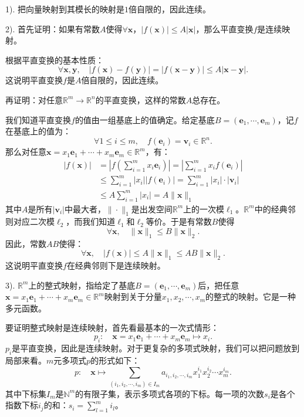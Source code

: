 \documentclass[12pt,UTF8,fontset=none]{ctexbook}
\begin{document}
\begin{so}
    1). 把向量映射到其模长的映射是$1$倍自限的，因此连续。

    2). 首先证明：如果有常数$A$使得$\forall \mathbf{x}$，$|f(\mathbf{x})|\leqslant A|\mathbf{x}|$，那么平直变换$f$是连续映射。

    根据平直变换的基本性质：
    $$ \forall \mathbf{x}, \mathbf{y}, \quad |f(\mathbf{x}) - f(\mathbf{y})| = |f(\mathbf{x} - \mathbf{y})| \leqslant A|\mathbf{x} - \mathbf{y}|.$$
    这说明平直变换$f$是$A$倍自限的，因此连续。

    再证明：对任意$\mathbb{R}^m \rightarrow \mathbb{R}^n$的平直变换，这样的常数$A$总存在。

    我们知道平直变换$f$的值由一组基底上的值确定。给定基底$B = (\mathbf{e}_1, \cdots, \mathbf{e}_m)$，记$f$在基底上的值为：
    $$ \forall 1\leqslant i\leqslant m, \quad f(\mathbf{e}_i) = \mathbf{v}_i\in\mathbb{R}^n.$$
    那么对任意$\mathbf{x} = x_1\mathbf{e}_1 + \cdots + x_m\mathbf{e}_m\in\mathbb{R}^m$，有：
    \begin{align*}
        |f(\mathbf{x})| &= \left|f\left(\sum_{i=1}^m x_i \mathbf{e}_i\right)\right| = \left|\sum_{i=1}^m x_i f\left(\mathbf{e}_i\right)\right| \\
        &\leqslant \sum_{i=1}^m |x_i| \left| f\left(\mathbf{e}_i\right)\right| = \sum_{i=1}^m |x_i|\cdot |\mathbf{v}_i| \\
        &\leqslant A \sum_{i=1}^m |x_i| = A\|\mathbf{x}\|_1
    \end{align*}
    其中$A$是所有$|\mathbf{v}_i|$中最大者，$\|\cdot\|_1$是出发空间$\mathbb{R}^m $上的一次模$\ell_1$。$\mathbb{R}^m $中的经典邻则对应二次模$\ell_2$，而我们知道$\ell_1$和$\ell_2$等价。于是有常数$B$使得
    $$ \forall \mathbf{x}, \quad \|\mathbf{x}\|_1 \leqslant B\|\mathbf{x}\|_2. $$
    因此，常数$AB$使得：
    $$ \forall \mathbf{x}, \quad |f(\mathbf{x})| \leqslant A\|\mathbf{x}\|_1 \leqslant AB\|\mathbf{x}\|_2. $$
    这说明平直变换$f$在经典邻则下是连续映射。

    3). $\mathbb{R}^m$上的整式映射，指给定了基底$B = (\mathbf{e}_1, \cdots, \mathbf{e}_m)$后，把任意$\mathbf{x} = x_1\mathbf{e}_1 + \cdots + x_m\mathbf{e}_m\in\mathbb{R}^m$映射到关于分量$x_1, x_2, \cdots, x_m$的整式的映射。它是一种多元函数。

    要证明整式映射是连续映射，首先看最基本的一次式情形：
    $$ p_i: \quad \mathbf{x} = x_1\mathbf{e}_1 + \cdots + x_m\mathbf{e}_m \mapsto x_i. $$
    $p_i$是平直变换，因此是连续映射。对于更复杂的多项式映射，我们可以把问题放到局部来看。$m$元多项式$p$的形式如下：
    $$ p: \quad \mathbf{x} \mapsto \sum_{(i_1,i_2,\cdots, i_m)\in I_m} a_{i_1, i_2, \cdots, i_m} x_1^{i_1} x_2^{i_2}\cdots x_m^{i_m}.$$
    其中下标集$I_m$是$\mathbb{N}^m$的有限子集，表示多项式各项的下标。每一项的次数$s_i$是各个指数下标$i_j$的和：$s_i = \sum_{l=1}^m i_l$。


\end{so}
\end{document}
